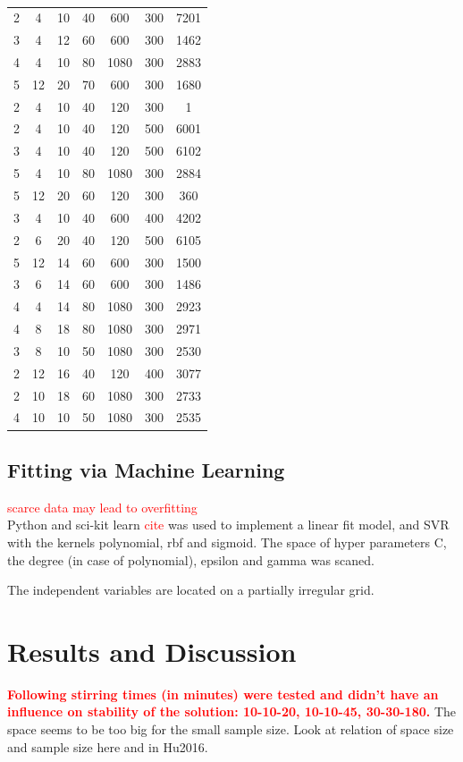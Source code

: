 \documentclass[a4paper]{article}
\newcommand{\todo}[1]{\textbf{\textcolor{red}{#1}}}
\newcommand{\td}[1]{\textcolor{red}{#1}}
\begin{document}
\begin{table}[htb]
\begin{tabular}{ccccccc}
2	&4	&10	&40	&600	&300	&7201	\\
3	&4	&12	&60	&600	&300	&1462	\\
4	&4	&10	&80	&1080	&300	&2883	\\
5	&12	&20	&70	&600	&300	&1680	\\
		\hline
2	&4	&10	&40	&120	&300	&1	\\
2	&4	&10	&40	&120	&500	&6001	\\
3	&4	&10	&40	&120	&500	&6102	\\
5	&4	&10	&80	&1080	&300	&2884	\\
5	&12	&20	&60	&120	&300	&360	\\
		\hline
3	&4	&10	&40	&600	&400	&4202	\\
2	&6	&20	&40	&120	&500	&6105	\\
5	&12	&14	&60	&600	&300	&1500	\\
3	&6	&14	&60	&600	&300	&1486	\\
4	&4	&14	&80	&1080	&300	&2923	\\
		\hline
4	&8	&18	&80	&1080	&300	&2971	\\
3	&8	&10	&50	&1080	&300	&2530	\\
2	&12	&16	&40	&120	&400	&3077	\\
2	&10	&18	&60	&1080	&300	&2733	\\
4	&10	&10	&50	&1080	&300	&2535	\\
		\hline
		\hline
	\end{tabular}
	\caption{}
	\label{tab:emma}
\end{table}



\subsection{Fitting via Machine Learning}
\td{scarce data may lead to overfitting\cite{Lecun1995conv}}\\
Python and sci-kit learn \td{cite} was used to implement a linear fit model, and SVR with the kernels polynomial, rbf and sigmoid. 
The space of hyper parameters C, the degree (in case of polynomial), epsilon and gamma was scaned. 

The independent variables are located on a partially irregular grid.  


\clearpage
\section{Results and Discussion}
\todo{Following stirring times (in minutes) were tested and didn't have an influence on stability of the solution: 10-10-20, 10-10-45, 30-30-180.}
The space seems to be too big for the small sample size.
Look at relation of space size and sample size here and in Hu2016.
\end{document}

